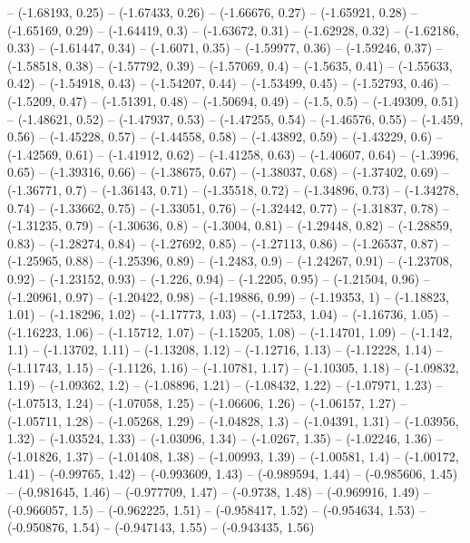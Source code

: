 -- (-1.68193, 0.25)
-- (-1.67433, 0.26)
-- (-1.66676, 0.27)
-- (-1.65921, 0.28)
-- (-1.65169, 0.29)
-- (-1.64419, 0.3)
-- (-1.63672, 0.31)
-- (-1.62928, 0.32)
-- (-1.62186, 0.33)
-- (-1.61447, 0.34)
-- (-1.6071, 0.35)
-- (-1.59977, 0.36)
-- (-1.59246, 0.37)
-- (-1.58518, 0.38)
-- (-1.57792, 0.39)
-- (-1.57069, 0.4)
-- (-1.5635, 0.41)
-- (-1.55633, 0.42)
-- (-1.54918, 0.43)
-- (-1.54207, 0.44)
-- (-1.53499, 0.45)
-- (-1.52793, 0.46)
-- (-1.5209, 0.47)
-- (-1.51391, 0.48)
-- (-1.50694, 0.49)
-- (-1.5, 0.5)
-- (-1.49309, 0.51)
-- (-1.48621, 0.52)
-- (-1.47937, 0.53)
-- (-1.47255, 0.54)
-- (-1.46576, 0.55)
-- (-1.459, 0.56)
-- (-1.45228, 0.57)
-- (-1.44558, 0.58)
-- (-1.43892, 0.59)
-- (-1.43229, 0.6)
-- (-1.42569, 0.61)
-- (-1.41912, 0.62)
-- (-1.41258, 0.63)
-- (-1.40607, 0.64)
-- (-1.3996, 0.65)
-- (-1.39316, 0.66)
-- (-1.38675, 0.67)
-- (-1.38037, 0.68)
-- (-1.37402, 0.69)
-- (-1.36771, 0.7)
-- (-1.36143, 0.71)
-- (-1.35518, 0.72)
-- (-1.34896, 0.73)
-- (-1.34278, 0.74)
-- (-1.33662, 0.75)
-- (-1.33051, 0.76)
-- (-1.32442, 0.77)
-- (-1.31837, 0.78)
-- (-1.31235, 0.79)
-- (-1.30636, 0.8)
-- (-1.3004, 0.81)
-- (-1.29448, 0.82)
-- (-1.28859, 0.83)
-- (-1.28274, 0.84)
-- (-1.27692, 0.85)
-- (-1.27113, 0.86)
-- (-1.26537, 0.87)
-- (-1.25965, 0.88)
-- (-1.25396, 0.89)
-- (-1.2483, 0.9)
-- (-1.24267, 0.91)
-- (-1.23708, 0.92)
-- (-1.23152, 0.93)
-- (-1.226, 0.94)
-- (-1.2205, 0.95)
-- (-1.21504, 0.96)
-- (-1.20961, 0.97)
-- (-1.20422, 0.98)
-- (-1.19886, 0.99)
-- (-1.19353, 1)
-- (-1.18823, 1.01)
-- (-1.18296, 1.02)
-- (-1.17773, 1.03)
-- (-1.17253, 1.04)
-- (-1.16736, 1.05)
-- (-1.16223, 1.06)
-- (-1.15712, 1.07)
-- (-1.15205, 1.08)
-- (-1.14701, 1.09)
-- (-1.142, 1.1)
-- (-1.13702, 1.11)
-- (-1.13208, 1.12)
-- (-1.12716, 1.13)
-- (-1.12228, 1.14)
-- (-1.11743, 1.15)
-- (-1.1126, 1.16)
-- (-1.10781, 1.17)
-- (-1.10305, 1.18)
-- (-1.09832, 1.19)
-- (-1.09362, 1.2)
-- (-1.08896, 1.21)
-- (-1.08432, 1.22)
-- (-1.07971, 1.23)
-- (-1.07513, 1.24)
-- (-1.07058, 1.25)
-- (-1.06606, 1.26)
-- (-1.06157, 1.27)
-- (-1.05711, 1.28)
-- (-1.05268, 1.29)
-- (-1.04828, 1.3)
-- (-1.04391, 1.31)
-- (-1.03956, 1.32)
-- (-1.03524, 1.33)
-- (-1.03096, 1.34)
-- (-1.0267, 1.35)
-- (-1.02246, 1.36)
-- (-1.01826, 1.37)
-- (-1.01408, 1.38)
-- (-1.00993, 1.39)
-- (-1.00581, 1.4)
-- (-1.00172, 1.41)
-- (-0.99765, 1.42)
-- (-0.993609, 1.43)
-- (-0.989594, 1.44)
-- (-0.985606, 1.45)
-- (-0.981645, 1.46)
-- (-0.977709, 1.47)
-- (-0.9738, 1.48)
-- (-0.969916, 1.49)
-- (-0.966057, 1.5)
-- (-0.962225, 1.51)
-- (-0.958417, 1.52)
-- (-0.954634, 1.53)
-- (-0.950876, 1.54)
-- (-0.947143, 1.55)
-- (-0.943435, 1.56)
